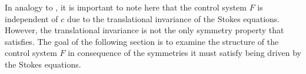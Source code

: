  In analogy to \cite{Alouges2017}, it is important to note here that the control system $F$ is independent of $c$ due to the translational invariance of the Stokes equations. However, the translational invariance is not the only symmetry property that \spr satisfies. The goal of the following section is to examine the structure of the control system $F$ in consequence of the symmetries it must satisfy being driven by the Stokes equations.






























